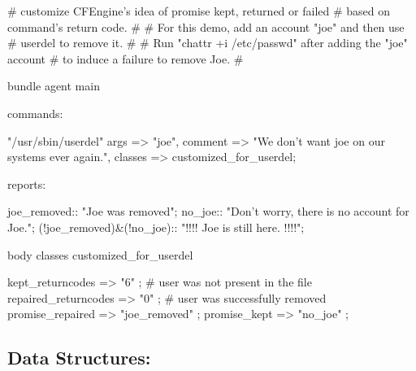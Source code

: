 \begin{codelisting}
\begin{code}
# customize CFEngine's idea of promise kept, returned or failed
# based on command's return code.
#
# For this demo, add an account "joe" and then use
# userdel to remove it.
#
# Run "chattr +i /etc/passwd" after adding the "joe" account
# to induce a failure to remove Joe.
#

bundle agent main {

  commands:

      "/usr/sbin/userdel"
        args => "joe",
        comment => "We don't want joe on our systems ever again.",
        classes => customized_for_userdel;

  reports:

      joe_removed::   "Joe was removed";
      no_joe::        "Don't worry, there is no account for Joe.";
      (!joe_removed)&(!no_joe)::  "!!!!  Joe is still here.  !!!!";
}

body classes customized_for_userdel {

        kept_returncodes => { "6" };   # user was not present in the file
        repaired_returncodes => { "0" }; # user was successfully removed
        promise_repaired => { "joe_removed" };
        promise_kept => { "no_joe" };
}
\end{code}
\end{codelisting}
\begin{codelisting}
\end{codelisting}





\subsection{Data Structures:}

